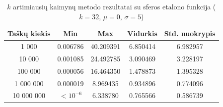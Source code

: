 \begin{table}[H]
    \centering
    \begin{tabular}{|c|c|c|c|c|}
        \hline
        \textbf{Taškų kiekis} & \textbf{Min} & \textbf{Max} & \textbf{Vidurkis} & \textbf{Std. nuokrypis} \\ \hline
        1 000        & 0.006786 & 40.209391 & 6.850414 & 6.982957 \\ \hline
        10 000       & 0.001085 & 24.492785 & 3.090469 & 3.228197 \\ \hline
        100 000      & 0.000056 & 16.464350 & 1.478873 & 1.395328 \\ \hline
        1 000 000    & 0.000019 & 8.969435 & 0.934896 & 0.774096 \\ \hline
        10 000 000   & $<10^{-6}$ & 6.338780 & 0.765566 & 0.586739 \\ \hline
    \end{tabular}
    \caption{$k$ artimiausių kaimynų metodo rezultatai su sferos etalono funkcija ($k = 32$, $\mu = 0$, $\sigma = 5$)}
\end{table}